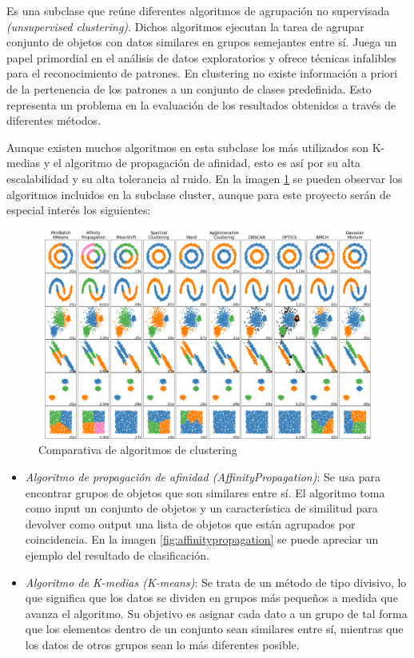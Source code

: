 \documentclass[a4paper, 12pt]{book}
\begin{document}
Es una subclase que reúne diferentes algoritmos de agrupación no supervisada \textit{(unsupervised clustering)}. Dichos algoritmos ejecutan la tarea de agrupar conjunto de objetos con datos similares en grupos semejantes entre sí. Juega un papel primordial en el análisis de datos exploratorios y ofrece técnicas infalibles para el reconocimiento de patrones. En clustering no existe información a priori de la pertenencia de los patrones a un conjunto de clases predefinida. Esto representa un problema en la evaluación de los resultados obtenidos a través de diferentes métodos.

Aunque existen muchos algoritmos en esta subclase los más utilizados son K-medias y el algoritmo de propagación de afinidad, esto es así por su alta escalabilidad y su alta tolerancia al ruido. En la imagen \ref{fig:comparativa_algoritmos} se pueden observar los algoritmos incluidos en la subclase cluster, aunque para este proyecto serán de especial interés los siguientes:

\begin{figure}[!htb]
    \centering
    \includegraphics[width=16cm, keepaspectratio]{img/algorithm_comparison.png}
    \caption{Comparativa de algoritmos de clustering}
    \label{fig:comparativa_algoritmos}
\end{figure}

\begin{itemize}
\item \textit{Algoritmo de propagación de afinidad (AffinityPropagation)}: Se usa para encontrar grupos de objetos que son similares entre sí. El algoritmo toma como input un conjunto de objetos y un característica de similitud para devolver como output una lista de objetos que están agrupados por coincidencia. En la imagen \ref{fig:affinitypropagation} se puede apreciar un ejemplo del resultado de clasificación.
\item \textit{Algoritmo de K-medias (K-means)}: Se trata de un método de tipo divisivo, lo que significa que los datos se dividen en grupos más pequeños a medida que avanza el algoritmo. Su objetivo es asignar cada dato a un grupo de tal forma que los elementos dentro de un conjunto sean similares entre sí,  mientras que los datos de otros grupos sean lo más diferentes posible.
\end{itemize}
\end{document}
